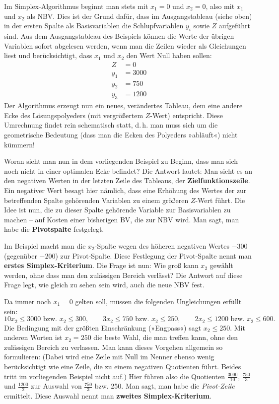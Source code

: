 Im Simplex-Algorithmus beginnt man stets mit $x_1 = 0$ und $x_2 = 0$, also mit $x_1$ und $x_2$ als NBV. Dies ist der Grund dafür, dass im Ausgangstableau (siehe oben) in der ersten Spalte als Basisvariablen die Schlupfvariablen $y_i$ sowie $Z$ aufgeführt sind. Aus dem Ausgangstableau des Beispiels können die Werte der übrigen Variablen sofort abgelesen werden, wenn man die Zeilen wieder als Gleichungen liest und berücksichtigt, dass $x_1$ und $x_2$ den Wert Null haben sollen:
\begin{align*}
  Z &= 0\\
  y_1 &= 3000\\
  y_2 &= 750\\
  y_3 &= 1200
\end{align*}
Der Algorithmus erzeugt nun ein neues, verändertes Tableau, dem eine andere Ecke des Lösungspolyeders (mit vergrößertem $Z$-Wert) entspricht. Diese Umrechnung findet rein schematisch statt, d.\,h. man muss sich um die geometrische Bedeutung (dass man die Ecken des Polyeders »abläuft«) nicht kümmern!

Woran sieht man nun in dem vorliegenden Beispiel zu Beginn, dass man sich noch nicht in einer optimalen Ecke befindet? Die Antwort lautet: Man sieht es an den negativen Werten in der letzten Zeile des Tableaus, der \textbf{Zielfunktionszeile}. Ein negativer Wert besagt hier nämlich, dass eine Erhöhung des Wertes der zur betreffenden Spalte gehörenden Variablen zu einem größeren $Z$-Wert führt. Die Idee ist nun, die zu dieser Spalte gehörende Variable zur Basisvariablen zu machen -- auf Kosten einer bisherigen BV, die zur NBV wird. Man sagt, man habe die \textbf{Pivotspalte} festgelegt.

Im Beispiel macht man die $x_2$-Spalte wegen des höheren negativen Wertes $-300$ (gegenüber $-200$) zur Pivot-Spalte. Diese Festlegung der Pivot-Spalte nennt man \textbf{erstes Simplex-Kriterium}. Die Frage ist nun: Wie groß kann $x_2$ gewählt werden, ohne dass man den zulässigen Bereich verlässt? Die Antwort auf diese Frage legt, wie gleich zu sehen sein wird, auch die neue NBV fest.

Da immer noch $x_1 = 0$ gelten soll, müssen die folgenden Ungleichungen erfüllt sein:
\[ 10x_2 \leq 3000 \text{ bzw. } x_2 \leq 300, \qquad 3x_2 \leq 750 \text{ bzw. } x_2 \leq 250, \qquad 2x_2 \leq 1200 \text{ bzw. } x_2 \leq 600 . \]
Die Bedingung mit der größten Einschränkung (»Engpass«) sagt $x_2 \leq 250$. Mit anderen Worten ist $x_2 = 250$ die beste Wahl, die man treffen kann, ohne den zulässigen Bereich zu verlassen. Man kann dieses Vorgehen allgemein so formulieren:
(Dabei wird eine Zeile mit Null im Nenner ebenso wenig berücksichtigt wie eine Zeile, die zu einem negativen Quotienten führt. Beides tritt im vorliegenden Beispiel nicht auf.)
Hier führen also die Quotienten $\tfrac{3000}{10}$, $\tfrac{750}{3}$ und $\tfrac{1200}{2}$ zur Auswahl von $\tfrac{750}{3}$ bzw. 250. Man sagt, man habe die \textit{Pivot-Zeile} ermittelt. Diese Auswahl nennt man \textbf{zweites Simplex-Kriterium}.

